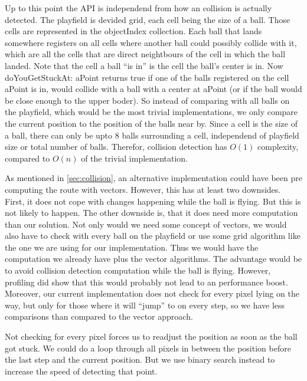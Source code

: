 Up to this point the API is independend from how an collision is actually detected.
The playfield is devided grid, each cell being the size of a ball. Those cells are represented
in the objectIndex collection. Each ball that lands somewhere registers on all cells where
another ball could possibly collide with it, which are all the cells that are direct neightbours
of the cell in which the ball landed. Note that the cell a ball ``is in'' is the cell the ball's
center is in. Now doYouGetStuckAt: aPoint returns true if one of the balls registered on the
cell aPoint is in, would collide with a ball with a center at aPoint (or if the ball would be
close enough to the upper boder). So instead of comparing with all balls on the playfield, which
would be the most trivial implementations, we only compare the current position to the position
of the balls near by. Since a cell is the size of a ball, there can only be upto 8 balls surrounding
a cell, independend of playfield size or total number of balls. Therefor, collision detection has
$O(1)$ complexity, compared to $O(n)$ of the trivial implementation.

As mentioned in \ref{sec:collision}, an alternative implementation could have been pre computing the route
with vectors. However, this has at least two downsides. First, it does not cope with changes happening
while the ball is flying. But this is not likely to happen. The other downside is, that it does need more
computation than our solution. Not only would we need some concept of vectors, we would also have to check
with every ball on the playfield or use some grid algorithm like the one we are using for our implementation.
Thus we would have the computation we already have plus the vector algorithms. The advantage would be to avoid
collision detection computation while the ball is flying. However, profiling did show that this would probably
not lead to an performance boost. Moreover, our current implementation does not check for every pixel lying
on the way, but only for those where it will ``jump'' to on every step, so we have less comparisons than compared
to the vector approach.

Not checking for every pixel forces us to readjust the position as soon as the ball got stuck. We could do a loop
through all pixels in between the position before the last step and the current position. But we use binary search
instead to increase the speed of detecting that point.
%

